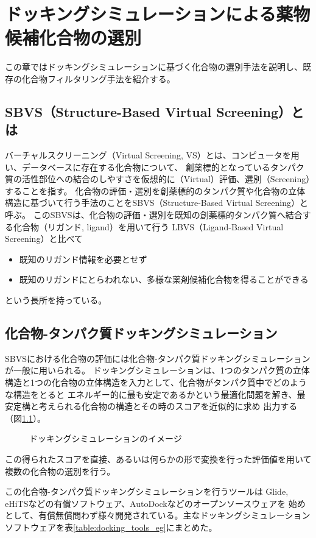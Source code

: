 \chapter{ドッキングシミュレーションによる薬物候補化合物の選別}
この章ではドッキングシミュレーションに基づく化合物の選別手法を説明し、既存の化合物フィルタリング手法を紹介する。

\section{SBVS（Structure-Based Virtual Screening）とは}
バーチャルスクリーニング（Virtual Screening, VS）とは、コンピュータを用い、データベースに存在する化合物について、
創薬標的となっているタンパク質の活性部位への結合のしやすさを仮想的に（Virtual）評価、選別（Screening）することを指す。
化合物の評価・選別を創薬標的のタンパク質や化合物の立体構造に基づいて行う手法のことをSBVS（Structure-Based Virtual Screening）と呼ぶ。
このSBVSは、化合物の評価・選別を既知の創薬標的タンパク質へ結合する化合物（リガンド, ligand）を用いて行う
LBVS（Ligand-Based Virtual Screening）と比べて
\begin{itemize}
\item 既知のリガンド情報を必要とせず
\item 既知のリガンドにとらわれない、多様な薬剤候補化合物を得ることができる
\end{itemize}
という長所を持っている。

\section{化合物-タンパク質ドッキングシミュレーション}
SBVSにおける化合物の評価には化合物-タンパク質ドッキングシミュレーションが一般に用いられる。
ドッキングシミュレーションは、1つのタンパク質の立体構造と1つの化合物の立体構造を入力として、化合物がタンパク質中でどのような構造をとると
エネルギー的に最も安定であるかという最適化問題を解き、最安定構と考えられる化合物の構造とその時のスコアを近似的に求め
出力する（図\ref{fig:docking}）。
\begin{figure}[tb]
 \begin{center}
  \caption{ドッキングシミュレーションのイメージ}
  \label{fig:docking}
 \end{center}
\end{figure}
この得られたスコアを直接、あるいは何らかの形で変換を行った評価値を用いて複数の化合物の選別を行う。

この化合物-タンパク質ドッキングシミュレーションを行うツールは
Glide\cite{Friesner2004}, eHiTS\cite{Zsoldos2007}などの有償ソフトウェア、AutoDock\cite{Morris2009}などのオープンソースウェアを
始めとして、有償無償問わず様々開発されている。主なドッキングシミュレーションソフトウェアを表\ref{table:docking_tools_eg}にまとめた。

